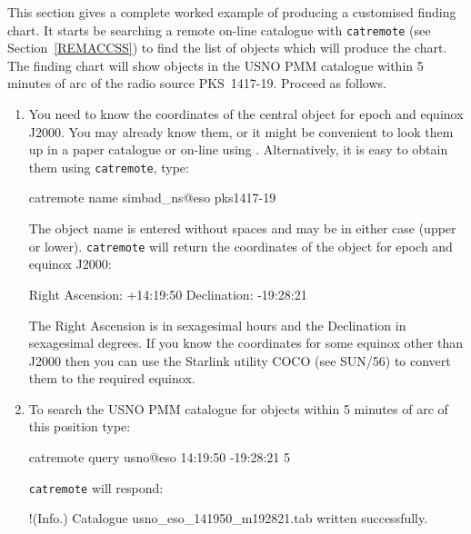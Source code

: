 \documentclass[twoside,11pt]{starlink}
\begin{document}
This section gives a complete worked example of producing a customised
finding chart.  It starts be searching a remote on-line catalogue with
\texttt{catremote} (see Section~\ref{REMACCSS}) to find the list of objects
which will produce the chart.  The finding chart will show objects in the
USNO PMM catalogue\cite{PMM} within 5 minutes of arc of the radio source
PKS~1417-19.  Proceed as follows.

\begin{enumerate}

  \item You need to know the coordinates of the central object for epoch
   and equinox J2000.  You may already know them, or it might be
   convenient to look them up in a paper catalogue or on-line using
   .
   Alternatively, it is easy to obtain them using \texttt{catremote}, type:

  \begin{terminalv}
catremote name  simbad_ns@eso  pks1417-19
  \end{terminalv}

   The object name is entered without spaces and may be in either case
   (upper or lower).  \texttt{catremote} will return the coordinates of
   the object for epoch and equinox J2000:

  \begin{terminalv}
Right Ascension: +14:19:50
Declination: -19:28:21
  \end{terminalv}

   The Right Ascension is in sexagesimal hours and the Declination in
   sexagesimal degrees.  If you know the coordinates for some equinox other
   than J2000 then you can use the Starlink utility COCO (see
   SUN/56\cite{SUN56}) to convert them to the required equinox.

  \item To search the USNO PMM catalogue\cite{PMM} for objects within
   5 minutes of arc of this position type:

  \begin{terminalv}
catremote query usno@eso  14:19:50  -19:28:21  5
  \end{terminalv}

   \texttt{catremote} will respond:

  \begin{terminalv}
!(Info.) Catalogue usno_eso_141950_m192821.tab written successfully.
  \end{terminalv}


\end{enumerate}
\end{document}
